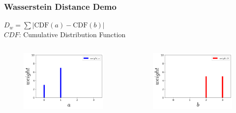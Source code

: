 \documentclass{beamer}
\begin{document}
\begin{frame}
\frametitle{Wasserstein Distance Demo}
\setlength{\abovecaptionskip}{-2mm}
\setlength{\belowcaptionskip}{0mm}
$D_{w}=\sum|\mathrm{CDF}(a) - \mathrm{CDF}(b)|$ \\
$CDF$: Cumulative Distribution Function
\begin{columns}
\begin{figure}
    \centering
    \includegraphics[width=1.0\linewidth]{img/a.png}
\end{figure}
\vspace{-7mm}
\begin{figure}
    \centering
    \includegraphics[width=1.0\linewidth]{img/b.png}
\end{figure}
\begin{tikzpicture}

\end{tikzpicture}
\end{columns}
\end{frame}
\end{document}
